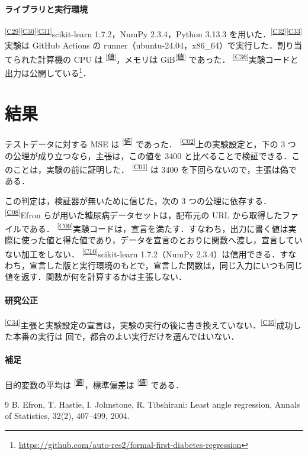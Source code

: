\documentclass[9pt,a4paper,twocolumn]{ltjsarticle}
\newcommand{\schemaurl}{https://github.com/auto-res2/formal-first-diabetes-regression/blob/b21140a/formal/claims.json}
\newcommand{\cid}[1]{\textsuperscript{\textsf{\scriptsize[\href{\schemaurl\#L\csname line#1\endcsname}{#1}]}}}
\newcommand{\val}[1]{\textsuperscript{\textsf{\scriptsize[\href{\schemaurl\#L\csname line#1\endcsname}{値}]}}}
\begin{document}
\paragraph{ライブラリと実行環境}
\cid{C29}\cid{C30}\cid{C31}scikit-learn 1.7.2，NumPy 2.3.4，Python 3.13.3 を用いた．\cid{C32}\cid{C33}実験は GitHub Actions の runner（ubuntu-24.04，x86\_64）で実行した．割り当てられた計算機の CPU は \CpuModel\val{cpuModel}，メモリは \MemoryGib{} GiB\val{memoryGib} であった．
\cid{C36}実験コードと出力は公開している\footnote{\url{https://github.com/auto-res2/formal-first-diabetes-regression}}．

\section{結果}
\label{sec:result}

テストデータに対する MSE は \TestMse\val{testMse} であった．
\cid{C02}上の実験設定と，下の 3 つの公理が成り立つなら，主張は，この値を 3400 と比べることで検証できる．このことは，実験の前に証明した．
\cid{C01}\TestMse{} は 3400 を下回らないので，主張は偽である．

この判定は，検証器が無いために信じた，次の 3 つの公理に依存する．
\cid{C08}Efron らが用いた糖尿病データセットは，配布元の URL から取得したファイルである．
\cid{C09}実験コードは，宣言を満たす．すなわち，出力に書く値は実際に使った値と得た値であり，データを宣言のとおりに関数へ渡し，宣言していない加工をしない．
\cid{C10}scikit-learn 1.7.2（NumPy 2.3.4）は信用できる．すなわち，宣言した版と実行環境のもとで，宣言した関数は，同じ入力にいつも同じ値を返す．関数が何を計算するかは主張しない．

\paragraph{研究公正}
\cid{C34}主張と実験設定の宣言は，実験の実行の後に書き換えていない．\cid{C35}成功した本番の実行は \NFullRuns{} 回で，都合のよい実行だけを選んではいない．

\paragraph{補足}
目的変数の平均は \TargetMean\val{targetMean}，標準偏差は \TargetStd\val{targetStd} である．

\begin{thebibliography}{9}
\small
{} B. Efron, T. Hastie, I. Johnstone, R. Tibshirani: Least angle regression, Annals of Statistics, 32(2), 407--499, 2004.
\end{thebibliography}
\end{document}
